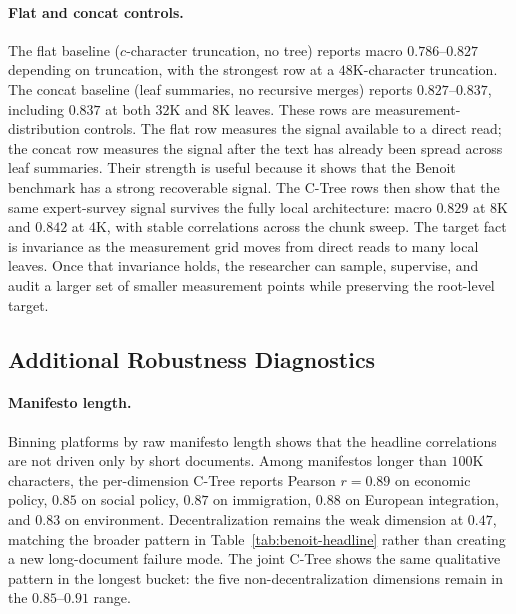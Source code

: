 \paragraph{Flat and concat controls.} The flat baseline ($c$-character
truncation, no tree) reports macro $0.786$--$0.827$ depending on
truncation, with the strongest row at a $48\mathrm{K}$-character
truncation. The concat baseline (leaf summaries, no recursive merges)
reports $0.827$--$0.837$, including $0.837$ at both $32\mathrm{K}$ and
$8\mathrm{K}$ leaves. These rows are measurement-distribution controls.
The flat row measures the signal available to a direct read; the concat
row measures the signal after the text has already been spread across
leaf summaries. Their strength is useful because it shows that the
Benoit benchmark has a strong recoverable signal. The C-Tree rows then
show that the same expert-survey signal survives the fully local architecture: macro
$0.829$ at $8\mathrm{K}$ and $0.842$ at $4\mathrm{K}$, with stable
correlations across the chunk sweep. The target fact is invariance as
the measurement grid moves from direct reads to many local leaves. Once
that invariance holds, the researcher can sample, supervise, and audit a
larger set of smaller measurement points while preserving the
root-level target.

\subsection{Additional Robustness Diagnostics}

\paragraph{Manifesto length.} Binning platforms by raw manifesto length
shows that the headline correlations are not driven only by short
documents. Among manifestos longer than $100\mathrm{K}$ characters, the
per-dimension C-Tree reports Pearson $r=0.89$ on economic policy,
$0.85$ on social policy, $0.87$ on immigration, $0.88$ on European
integration, and $0.83$ on environment. Decentralization remains the
weak dimension at $0.47$, matching the broader pattern in
Table~\ref{tab:benoit-headline} rather than creating a new long-document
failure mode. The joint C-Tree shows the same qualitative pattern in the
longest bucket: the five non-decentralization dimensions remain in the
$0.85$--$0.91$ range.

